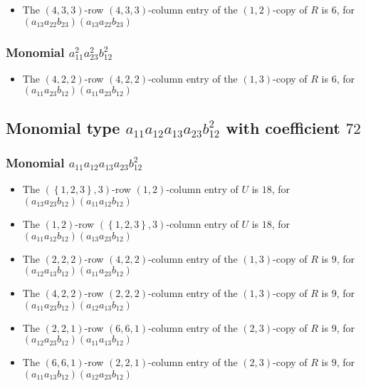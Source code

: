 \documentclass{article}
\begin{document}
\begin{itemize}
\item The $(4, 3, 3)$-row $(4, 3, 3)$-column entry of the $ \left(1, 2\right) $-copy of $R$ is $ 6 $, for $( a_{13} a_{22} b_{23} )( a_{13} a_{22} b_{23} )$ 
\end{itemize}
\subsubsection{Monomial $ a_{11}^{2} a_{23}^{2} b_{12}^{2} $}

\begin{itemize}
\item The $(4, 2, 2)$-row $(4, 2, 2)$-column entry of the $ \left(1, 3\right) $-copy of $R$ is $ 6 $, for $( a_{11} a_{23} b_{12} )( a_{11} a_{23} b_{12} )$ 
\end{itemize}
\subsection{Monomial type $ a_{11} a_{12} a_{13} a_{23} b_{12}^{2} $ with coefficient $ 72 $}

\subsubsection{Monomial $ a_{11} a_{12} a_{13} a_{23} b_{12}^{2} $}

\begin{itemize}
\item The $ \left(\left\{1, 2, 3\right\}, 3\right) $-row $ \left(1, 2\right) $-column entry of $U$ is $ 18 $, for $( a_{13} a_{23} b_{12} )( a_{11} a_{12} b_{12} )$ 
\item The $ \left(1, 2\right) $-row $ \left(\left\{1, 2, 3\right\}, 3\right) $-column entry of $U$ is $ 18 $, for $( a_{11} a_{12} b_{12} )( a_{13} a_{23} b_{12} )$ 
\item The $(2, 2, 2)$-row $(4, 2, 2)$-column entry of the $ \left(1, 3\right) $-copy of $R$ is $ 9 $, for $( a_{12} a_{13} b_{12} )( a_{11} a_{23} b_{12} )$ 
\item The $(4, 2, 2)$-row $(2, 2, 2)$-column entry of the $ \left(1, 3\right) $-copy of $R$ is $ 9 $, for $( a_{11} a_{23} b_{12} )( a_{12} a_{13} b_{12} )$ 
\item The $(2, 2, 1)$-row $(6, 6, 1)$-column entry of the $ \left(2, 3\right) $-copy of $R$ is $ 9 $, for $( a_{12} a_{23} b_{12} )( a_{11} a_{13} b_{12} )$ 
\item The $(6, 6, 1)$-row $(2, 2, 1)$-column entry of the $ \left(2, 3\right) $-copy of $R$ is $ 9 $, for $( a_{11} a_{13} b_{12} )( a_{12} a_{23} b_{12} )$ 
\end{itemize}
\end{document}
